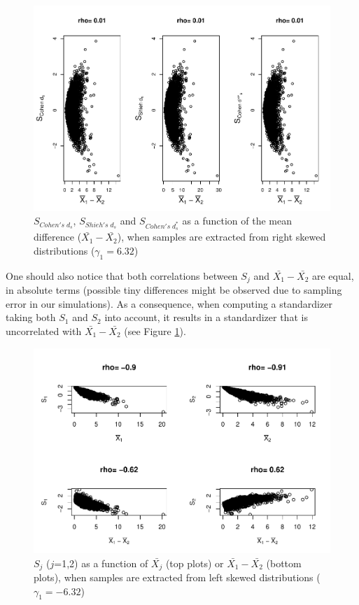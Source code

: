 \documentclass[
  english,
  man,mask]{apa6}
\begin{document}
\begin{figure}
\centering
\includegraphics{Correlation_files/figure-latex/pltStdzrHombalRskew-1.pdf}
\caption{\label{fig:pltStdzrHombalRskew}\(S_{Cohen's \; d_s}\), \(S_{Shieh's \; d_s}\) and \(S_{Cohen's \; d^*_s}\) as a function of the mean difference (\(\bar{X_1}-\bar{X_2}\)), when samples are extracted from right skewed distributions (\(\gamma_1 = 6.32\))}
\end{figure}

One should also notice that both correlations between \(S_j\) and \(\bar{X_1}-\bar{X_2}\) are equal, in absolute terms (possible tiny differences might be observed due to sampling error in our simulations). As a consequence, when computing a standardizer taking both \(S_1\) and \(S_2\) into account, it results in a standardizer that is uncorrelated with \(\bar{X_1}-\bar{X_2}\) (see Figure \ref{fig:pltStdzrHombalRskew}).

\begin{figure}
\centering
\includegraphics{Correlation_files/figure-latex/pltSDHombalLskew-1.pdf}
\caption{\label{fig:pltSDHombalLskew}\(S_j\) (\(j\)=1,2) as a function of \(\bar{X_j}\) (top plots) or \(\bar{X_1}-\bar{X_2}\) (bottom plots), when samples are extracted from left skewed distributions (\(\gamma_1 = -6.32\))}
\end{figure}
\end{document}
